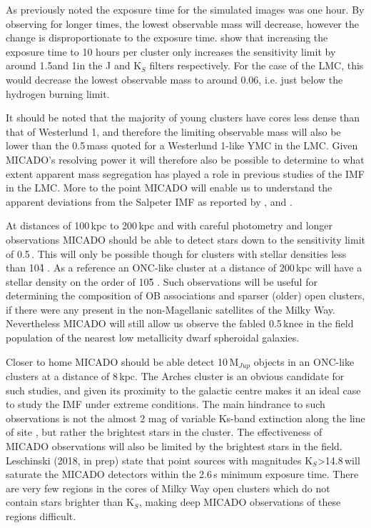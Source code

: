 As previously noted the exposure time for the simulated images was one hour. By
observing for longer times, the lowest observable mass will decrease, however
the change is disproportionate to the exposure time. \citet{leschinski2016}
show that increasing the exposure time to 10 hours per cluster only increases
the sensitivity limit by around 1.5\m and 1\m in the J and K$_S$ filters
respectively. For the case of the LMC, this would decrease the lowest
observable mass to around 0.06\msune, i.e. just below the hydrogen burning
limit.

It should be noted that the majority of young clusters have cores 
less dense than that of Westerlund 1, and therefore the limiting observable
mass will also be lower than the 0.5\,\msun mass quoted for a Westerlund 1-like
YMC in the LMC. Given MICADO's resolving power it will therefore also be
possible to determine to what extent apparent mass segregation has played a
role in previous studies of the IMF in the LMC. More to the point MICADO will
enable us to understand the apparent deviations from the Salpeter IMF as
reported by \citet{dario2009}, \citet{geha2013} and \citet{kalirai2013}.

At distances of 100\,kpc to 200\,kpc and with careful photometry and longer
observations MICADO should be able to detect stars down to the sensitivity
limit of 0.5\,\msun. This will only be possible though for clusters with
stellar densities less than 10\h4 \spa. As a reference an ONC-like cluster at a
distance of 200\,kpc will have a stellar density on the order of 10\h5 \spa.
Such observations will be useful for determining the composition of OB
associations and sparser (older) open clusters, if there were any present in
the non-Magellanic satellites of the Milky Way. Nevertheless MICADO will still
allow us observe the fabled 0.5\,\msun knee in the field population of the
nearest low metallicity dwarf spheroidal galaxies.

Closer to home MICADO should be able detect 10\,M$_{Jup}$ objects in an
ONC-like clusters at a distance of 8\,kpc. The Arches cluster is an obvious
candidate for such studies, and given its proximity to the galactic centre
makes it an ideal case to study the IMF under extreme conditions. The main
hindrance to such observations is not the almost 2 mag of variable Ks-band
extinction  along the line of site \citep{espinoza2009}, but rather the
brightest stars in the cluster. The effectiveness of MICADO observations will
also be limited by the brightest stars in the field. Leschinski (2018, in prep)
state that point sources with magnitudes K$_S$\textgreater14.8\,\m will
saturate the MICADO detectors within the 2.6\,s minimum exposure time. There
are very few regions in the cores of Milky Way open clusters which do not
contain stars brighter than K$_S$\m, making deep MICADO observations of
these regions difficult.


